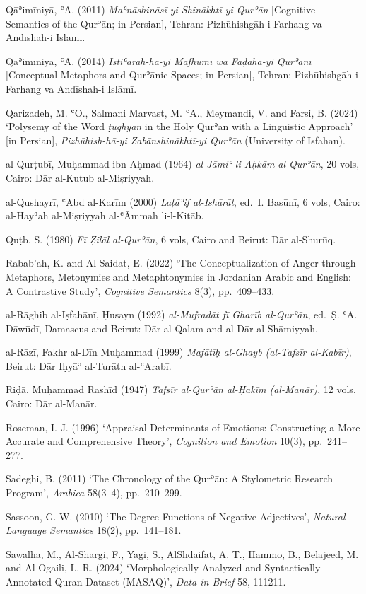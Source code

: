 \documentclass[11pt,a4paper]{article}
\begin{document}
Qāʾimīniyā, ʿA. (2011) \emph{Maʿnāshināsī-yi Shinākhtī-yi Qurʾān}
{[}Cognitive Semantics of the Qurʾān; in Persian{]}, Tehran:
Pizhūhishgāh-i Farhang va Andīshah-i Islāmī.

Qāʾimīniyā, ʿA. (2014) \emph{Istiʿārah-hā-yi Mafhūmī wa Faḍāhā-yi
Qurʾānī} {[}Conceptual Metaphors and Qurʾānic Spaces; in Persian{]},
Tehran: Pizhūhishgāh-i Farhang va Andīshah-i Islāmī.

Qarizadeh, M. ʿO., Salmani Marvast, M. ʿA., Meymandi, V. and Farsi, B.
(2024) `Polysemy of the Word \emph{ṭughyān} in the Holy Qurʾān with a
Linguistic Approach' {[}in Persian{]}, \emph{Pizhūhish-hā-yi
Zabānshinākhtī-yi Qurʾān} (University of Isfahan).

al-Qurṭubī, Muḥammad ibn Aḥmad (1964) \emph{al-Jāmiʿ li-Aḥkām
al-Qurʾān}, 20 vols, Cairo: Dār al-Kutub al-Miṣriyyah.

al-Qushayrī, ʿAbd al-Karīm (2000) \emph{Laṭāʾif al-Ishārāt}, ed.~I.
Basūnī, 6 vols, Cairo: al-Hayʾah al-Miṣriyyah al-ʿĀmmah li-l-Kitāb.

Quṭb, S. (1980) \emph{Fī Ẓilāl al-Qurʾān}, 6 vols, Cairo and Beirut: Dār
al-Shurūq.

Rabab'ah, K. and Al-Saidat, E. (2022) `The Conceptualization of Anger
through Metaphors, Metonymies and Metaphtonymies in Jordanian Arabic and
English: A Contrastive Study', \emph{Cognitive Semantics} 8(3),
pp.~409--433.

al-Rāghib al-Iṣfahānī, Ḥusayn (1992) \emph{al-Mufradāt fī Gharīb
al-Qurʾān}, ed.~Ṣ. ʿA. Dāwūdī, Damascus and Beirut: Dār al-Qalam and
al-Dār al-Shāmiyyah.

al-Rāzī, Fakhr al-Dīn Muḥammad (1999) \emph{Mafātīḥ al-Ghayb (al-Tafsīr
al-Kabīr)}, Beirut: Dār Iḥyāʾ al-Turāth al-ʿArabī.

Riḍā, Muḥammad Rashīd (1947) \emph{Tafsīr al-Qurʾān al-Ḥakīm
(al-Manār)}, 12 vols, Cairo: Dār al-Manār.

Roseman, I. J. (1996) `Appraisal Determinants of Emotions: Constructing
a More Accurate and Comprehensive Theory', \emph{Cognition and Emotion}
10(3), pp.~241--277.

Sadeghi, B. (2011) `The Chronology of the Qurʾān: A Stylometric Research
Program', \emph{Arabica} 58(3--4), pp.~210--299.

Sassoon, G. W. (2010) `The Degree Functions of Negative Adjectives',
\emph{Natural Language Semantics} 18(2), pp.~141--181.

Sawalha, M., Al-Shargi, F., Yagi, S., AlShdaifat, A. T., Hammo, B.,
Belajeed, M. and Al-Ogaili, L. R. (2024) `Morphologically-Analyzed and
Syntactically-Annotated Quran Dataset (MASAQ)', \emph{Data in Brief} 58,
111211.
\end{document}
